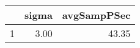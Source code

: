 \begin{table}[h]
\centering
\begin{tabular}{rrr}
  \hline
 & sigma & avgSampPSec \\ 
  \hline
1 & 3.00 & 43.35 \\ 
   \hline
\end{tabular}
\end{table}
